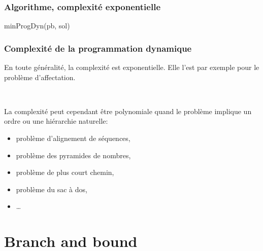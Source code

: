 \documentclass{beamer}
\begin{document}
\begin{frame}
  \frametitle{Algorithme, complexité exponentielle}

  \begin{algorithm}[H]
    \caption{minProgDyn(pb, sol)}
    \label{alg:minProgDyn}
  \end{algorithm}
\end{frame}

\begin{frame}
  \frametitle{Complexité de la programmation dynamique}

  En toute généralité, la complexité est exponentielle.
  Elle l'est par exemple pour le problème d'affectation.

  ~
  
  La complexité peut cependant être polynomiale quand le problème
  implique un ordre ou une hiérarchie naturelle:
  \begin{itemize}
  \item problème d'alignement de séquences,
  \item problème des pyramides de nombres, 
  \item problème de plus court chemin,
  \item problème du sac à dos,
  \item \dots
  \end{itemize}
  

\end{frame}

\section{Branch and bound}
\end{document}
